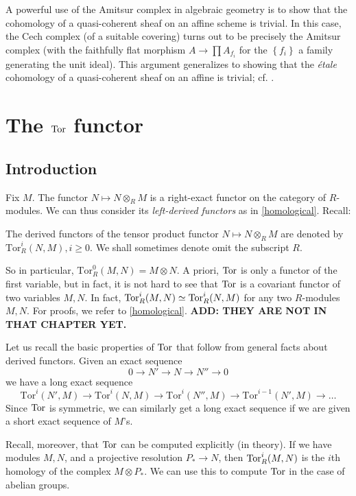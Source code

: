 \begin{remark} 
A powerful use of the Amitsur complex in algebraic geometry is to show that
the cohomology of a quasi-coherent sheaf on an affine scheme is trivial. In
this case, the Cech complex (of a suitable covering) turns out to be precisely
the Amitsur complex (with the faithfully flat morphism $A \to \prod A_{f_i}$
for the $\left\{f_i\right\}$ a family generating the unit ideal). This
argument generalizes to showing that the \emph{{\'e}tale}
cohomology of a quasi-coherent sheaf on an affine is trivial; cf. \cite{Ta94}.
\end{remark} 


\section{The $\operatorname{Tor}$ functor}
 

\subsection{Introduction}
Fix $M$. The functor $N \mapsto N \otimes_R M$ is a right-exact functor on the
category of $R$-modules. We can thus consider its \emph{left-derived functors}
as in \cref{homological}. 
Recall:

\begin{definition} 
The derived functors of the tensor product functor $N \mapsto N \otimes_R M$ are denoted by
$\mathrm{Tor} _R^i( N, M), i \geq 0$.  We shall sometimes denote omit the
subscript $R$.
\end{definition} 

So in particular, $\mathrm{Tor} _R^0(M,N) = M \otimes N$.  
A priori, $\operatorname{Tor}$ is only a functor of the first variable, but in fact, it is
not hard to see that $\operatorname{Tor}$ is a covariant functor of two variables $M, N$. 
In fact, $\operatorname{Tor}_R^i(M, N) \simeq \operatorname{Tor}_R^i(N, M)$ for any two $R$-modules $M, N$.
For proofs, we refer to \cref{homological}. \textbf{ADD: THEY ARE NOT IN THAT
CHAPTER YET.}

Let us recall the basic properties of $\operatorname{Tor}$ that follow from general facts
about derived functors. Given an exact sequence
\[ 0 \to N' \to N \to N'' \to 0 \]
we have a long exact sequence
\[ \mathrm{Tor} ^i(N',M) \to \mathrm{Tor} ^i(N,M) \to \mathrm{Tor} ^i(N'',M ) \to \mathrm{Tor} ^{i-1}(N',M) \to \dots \]
Since $\operatorname{Tor}$ is symmetric, we can similarly get a long exact sequence if we
are given a short exact sequence of $M$'s.

Recall, moreover, that $\operatorname{Tor}$ can be  computed explicitly (in theory). 
If we have modules $M, N$, and a projective resolution $P_* \to N$, then
$\operatorname{Tor}_R^i(M,N)$ is the $i$th homology of the complex $M \otimes P_*$. 
We can use this to compute $\operatorname{Tor}$ in the case of abelian groups.

